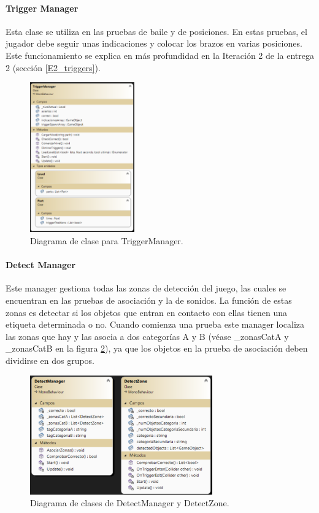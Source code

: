 \paragraph{Trigger Manager}
Esta clase se utiliza en las pruebas de baile y de posiciones. En estas pruebas, el jugador debe seguir unas indicaciones y colocar los brazos en varias posiciones. Este funcionamiento se explica en más profundidad en la Iteración 2 de la entrega 2 (sección \ref{E2_triggers}).

\begin{figure}
	\centering
	\includegraphics[width=0.4\textwidth]{04.Desarrollo/05.Entrega5/01.Iteracion5_1/00.Figuras/16.diagrama_trigger_manager.png}
	\caption{Diagrama de clase para TriggerManager.}
	\label{fig:diagramaTriggerManager}
\end{figure}


\paragraph{Detect Manager}
Este manager gestiona todas las zonas de detección del juego, las cuales se encuentran en las pruebas de asociación y la de sonidos. La función de estas zonas es detectar si los objetos que entran en contacto con ellas tienen una etiqueta determinada o no. Cuando comienza una prueba este manager localiza las zonas que hay y las asocia a dos categorías A y B (véase \_zonasCatA y \_zonasCatB en la figura \ref{fig:diagramaDetectManager}), ya que los objetos en la prueba de asociación deben dividirse en dos grupos. 


\begin{figure}
	\centering
	\includegraphics[width=0.7\textwidth]{04.Desarrollo/05.Entrega5/01.Iteracion5_1/00.Figuras/21.diagrama_detect_manager.png}
	\caption{Diagrama de clases de DetectManager y DetectZone.}
	\label{fig:diagramaDetectManager}
\end{figure}


